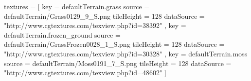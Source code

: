 textures = [
    {
        key         = defaultTerrain.grass
        source      = defaultTerrain/Grass0129_9_S.png
        tileHeight  = 128
        dataSource  = "http://www.cgtextures.com/texview.php?id=38392"
    }, {
        key         = defaultTerrain.frozen_ground
        source      = defaultTerrain/GrassFrozen0028_1_S.png
        tileHeight  = 128
        dataSource  = "http://www.cgtextures.com/texview.php?id=30328"
    }, {
        key         = defaultTerrain.moss
        source      = defaultTerrain/Moss0191_7_S.png
        tileHeight  = 128
        dataSource  = "http://www.cgtextures.com/texview.php?id=48602"
    }
]
